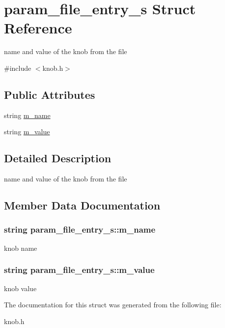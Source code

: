 \hypertarget{structparam__file__entry__s}{
\section{param\_\-file\_\-entry\_\-s Struct Reference}
\label{structparam__file__entry__s}
}


name and value of the knob from the file  




{\ttfamily \#include $<$knob.h$>$}

\subsection*{Public Attributes}
\begin{DoxyCompactItemize}
\item 
string \hyperlink{structparam__file__entry__s_ab6e7293d377cb8096750ab266ba0db3a}{m\_\-name}
\item 
string \hyperlink{structparam__file__entry__s_a6e496f0d5ce74bf6bf2602cd5e0f6472}{m\_\-value}
\end{DoxyCompactItemize}


\subsection{Detailed Description}
name and value of the knob from the file 

\subsection{Member Data Documentation}
\hypertarget{structparam__file__entry__s_ab6e7293d377cb8096750ab266ba0db3a}{
\subsubsection[{m\_\-name}]{\setlength{\rightskip}{0pt plus 5cm}string {\bf param\_\-file\_\-entry\_\-s::m\_\-name}}}
\label{structparam__file__entry__s_ab6e7293d377cb8096750ab266ba0db3a}
knob name \hypertarget{structparam__file__entry__s_a6e496f0d5ce74bf6bf2602cd5e0f6472}{
\subsubsection[{m\_\-value}]{\setlength{\rightskip}{0pt plus 5cm}string {\bf param\_\-file\_\-entry\_\-s::m\_\-value}}}
\label{structparam__file__entry__s_a6e496f0d5ce74bf6bf2602cd5e0f6472}
knob value 

The documentation for this struct was generated from the following file:\begin{DoxyCompactItemize}
\item 
knob.h\end{DoxyCompactItemize}
